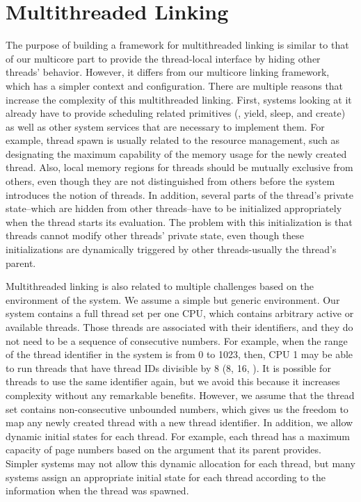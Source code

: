 \section{Multithreaded Linking}
\label{chapter:linking:sec:multithreaded-linking}


The purpose of building a framework for multithreaded linking is similar to  that of our multicore part to
provide the thread-local interface by hiding other threads' behavior. 
However, it differs from our multicore linking framework,  which has a simpler context and  configuration.
There are multiple reasons that increase the complexity of this multithreaded linking. 
First, systems looking at it already have to provide 
scheduling related primitives (\ie, yield, sleep, and create)
as well as other system services 
that are necessary to implement them.
For example, 
thread spawn is usually related to the 
resource management,
such as designating the maximum capability of the memory usage 
for the newly created thread. 
Also, 
local memory regions for threads should be 
mutually exclusive from others, even though 
they are not distinguished from others before the system introduces the notion of threads.
In addition,
several parts of the thread's private state--which are hidden from other threads--have to be initialized appropriately when the thread starts its evaluation.
The problem with this initialization is that threads cannot modify other threads' private state, even though these initializations are dynamically triggered by other threads-usually the thread's parent. 

Multithreaded linking is also related to 
multiple challenges based on the environment of the system.
We assume a simple but generic environment. 
Our system contains a full thread set per one CPU,
which contains arbitrary active or available threads.
Those threads are associated with their identifiers, and they do not need to be a sequence of consecutive numbers.
For example, when the range of
the thread identifier in the system is from 0 to 1023, 
then, CPU 1 may be able to run threads that have thread IDs divisible by 8 (8, 16, \etc). 
It is possible for threads to use the same identifier again, but we avoid this because it increases complexity without any remarkable benefits. 
However, we assume that the thread set contains non-consecutive unbounded numbers,
which gives us the freedom to map any newly created thread with a new thread identifier. 
In addition,
we allow dynamic initial states for each thread. 
For example, each thread has a maximum capacity of page numbers based on the argument that its parent 
provides.
Simpler systems may not allow this dynamic allocation for each thread,
but many systems assign an appropriate initial state for each thread 
according to the information when the thread was  spawned.


